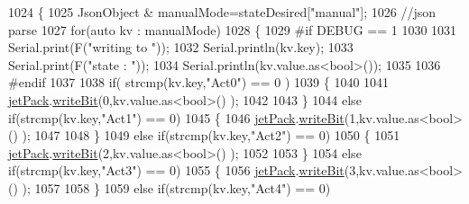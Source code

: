 \begin{DoxyCode}
1024             \{ 
1025                 JsonObject & manualMode=stateDesired[\textcolor{stringliteral}{"manual"}];
1026                 \textcolor{comment}{//json parse}
1027                 \textcolor{keywordflow}{for}(\textcolor{keyword}{auto} kv : manualMode)
1028                 \{
1029 \textcolor{preprocessor}{                #if DEBUG == 1}
1030 
1031                     Serial.print(F(\textcolor{stringliteral}{"writing to "}));
1032                     Serial.println(kv.key);
1033                     Serial.print(F(\textcolor{stringliteral}{"state : "}));
1034                     Serial.println(kv.value.as<\textcolor{keywordtype}{bool}>());        
1035                     
1036 \textcolor{preprocessor}{                #endif              }
1037 
1038                     \textcolor{keywordflow}{if}( strcmp(kv.key,\textcolor{stringliteral}{"Act0"}) == 0 )
1039                     \{
1040                     
1041                         \hyperlink{class_cool_board_a30b1357881b01ccbec676856a91e48e9}{jetPack}.\hyperlink{class_jetpack_a79ae7bc3c1828a0551a7c005c4f8bd00}{writeBit}(0,kv.value.as<\textcolor{keywordtype}{bool}>() ); 
1042                         
1043                     \}
1044                     \textcolor{keywordflow}{else} \textcolor{keywordflow}{if}(strcmp(kv.key,\textcolor{stringliteral}{"Act1"}) == 0)
1045                     \{
1046                         \hyperlink{class_cool_board_a30b1357881b01ccbec676856a91e48e9}{jetPack}.\hyperlink{class_jetpack_a79ae7bc3c1828a0551a7c005c4f8bd00}{writeBit}(1,kv.value.as<\textcolor{keywordtype}{bool}>() ); 
1047 
1048                     \}
1049                     \textcolor{keywordflow}{else} \textcolor{keywordflow}{if}(strcmp(kv.key,\textcolor{stringliteral}{"Act2"}) == 0)
1050                     \{
1051                         \hyperlink{class_cool_board_a30b1357881b01ccbec676856a91e48e9}{jetPack}.\hyperlink{class_jetpack_a79ae7bc3c1828a0551a7c005c4f8bd00}{writeBit}(2,kv.value.as<\textcolor{keywordtype}{bool}>() ); 
1052 
1053                     \}
1054                     \textcolor{keywordflow}{else} \textcolor{keywordflow}{if}(strcmp(kv.key,\textcolor{stringliteral}{"Act3"}) == 0)
1055                     \{
1056                         \hyperlink{class_cool_board_a30b1357881b01ccbec676856a91e48e9}{jetPack}.\hyperlink{class_jetpack_a79ae7bc3c1828a0551a7c005c4f8bd00}{writeBit}(3,kv.value.as<\textcolor{keywordtype}{bool}>() ); 
1057 
1058                     \}
1059                     \textcolor{keywordflow}{else} \textcolor{keywordflow}{if}(strcmp(kv.key,\textcolor{stringliteral}{"Act4"}) == 0)

\end{DoxyCode}
